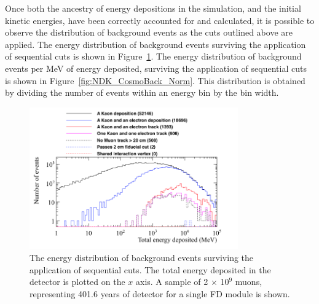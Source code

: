 Once both the ancestry of energy depositions in the simulation, and the initial kinetic energies, have been correctly accounted for and calculated, it is possible to observe the distribution of background events as the cuts outlined above are applied. The energy distribution of background events surviving the application of sequential cuts is shown in Figure~\ref{fig:NDK_CosmoBack_Raw}. The energy distribution of background events per MeV of energy deposited, surviving the application of sequential cuts is shown in Figure~\ref{fig:NDK_CosmoBack_Norm}. This distribution is obtained by dividing the number of events within an energy bin by the bin width. \\

\begin{figure}
  \centering
  \includegraphics[width=0.8\textwidth]{CosmicBackground_EnergyDepCuts_Raw_2cmCut}
  \caption[The energy distribution of background events surviving the application of sequential cuts.]
          {The energy distribution of background events surviving the application of sequential cuts. The total energy deposited in the detector is plotted on the $x$ axis. A sample of 2 $\times$ 10$^9$ muons, representing 401.6 years of detector for a single FD module is shown.}
  \label{fig:NDK_CosmoBack_Raw}
\end{figure}

